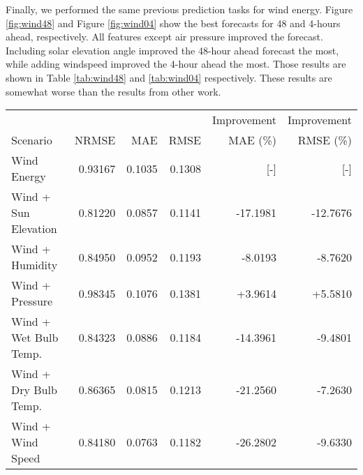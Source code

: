 Finally, we performed the same previous prediction tasks for wind energy.
Figure \ref{fig:wind48} and Figure \ref{fig:wind04} show the best forecasts for
48 and 4-hours ahead, respectively. All features except air pressure improved
the forecast. Including solar elevation angle improved the 48-hour ahead
forecast the most, while adding windspeed improved the 4-hour ahead the most.
Those results are shown in Table \ref{tab:wind48} and \ref{tab:wind04}
respectively.
These results are somewhat worse than the results from other work.


\begin{figure*}[h]
  \centering
  
  \caption{The optimized 48-hour ahead wind energy prediction. The inputs for this forecast were wind energy and solar elevation angle. \textit{Hyperparameters}: Reservoir Size:1000, Sparsity: 0.1, Spectral Radius: 0.9, Noise: 0.0001, Training Length: 19100, Prediction Window: 48, Random state: 85}
  \label{fig:wind48}
\end{figure*}
  \begin{table*}[h]
    \centering
    \caption{Tabulated error for 48-hour ahead wind forecasts with various coupled quantities. Improvement indicates the percentage improvement over the base case of forecasting wind energy alone.}
    \label{tab:wind48}
    \begin{tabular}{l|r|r|r|r|r}
      & & & & Improvement & Improvement \\
      Scenario &NRMSE & MAE & RMSE & MAE (\%) & RMSE (\%)\\
      \hline
      Wind Energy & 0.93167 & 0.1035 & 0.1308 & [-] & [-] \\
      Wind + Sun Elevation & 0.81220 & 0.0857 & 0.1141 & -17.1981 & -12.7676 \\
      Wind + Humidity & 0.84950 & 0.0952 & 0.1193 & -8.0193 & -8.7620 \\
      Wind + Pressure & 0.98345 & 0.1076 & 0.1381 & +3.9614 & +5.5810 \\
      Wind + Wet Bulb Temp. & 0.84323 & 0.0886 & 0.1184 & -14.3961 & -9.4801 \\
      Wind + Dry Bulb Temp. & 0.86365 & 0.0815 & 0.1213 & -21.2560 & -7.2630 \\
      Wind + Wind Speed & 0.84180 & 0.0763 & 0.1182 & -26.2802 & -9.6330 \\
    \end{tabular}
  \end{table*}
